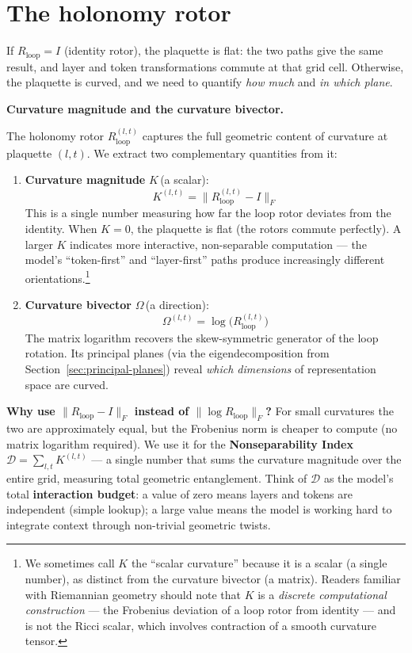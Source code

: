 \documentclass[11pt, twoside, openright]{memoir}
\numberwithin{equation}{chapter}
\begin{document}
\section{The holonomy rotor}

If $R_{\text{loop}} = I$ (identity rotor), the plaquette is flat:
the two paths give the same result, and layer and token
transformations commute at that grid cell.  Otherwise, the plaquette
is curved, and we need to quantify \emph{how much} and \emph{in
which plane}.

\begin{mathbox}
\textbf{Curvature magnitude and the curvature bivector.}

The holonomy rotor $R_{\text{loop}}^{(l,t)}$ captures the full
geometric content of curvature at plaquette $(l,t)$.  We extract two
complementary quantities from it:

\begin{enumerate}[nosep]
\item \textbf{Curvature magnitude} $K$\,(a scalar):
\begin{equation}
\label{eq:scalar-curvature}
  K^{(l,t)} = \|R_{\text{loop}}^{(l,t)} - I\|_F
\end{equation}
This is a single number measuring how far the loop rotor deviates
from the identity.  When $K = 0$, the plaquette is flat (the rotors
commute perfectly).  A larger $K$ indicates more interactive,
non-separable computation --- the model's ``token-first'' and
``layer-first'' paths produce increasingly different
orientations.\footnote{We sometimes call $K$ the ``scalar curvature''
because it is a scalar (a single number), as distinct from the
curvature bivector (a matrix).  Readers familiar with Riemannian
geometry should note that $K$ is a \emph{discrete computational
construction} --- the Frobenius deviation of a loop rotor from
identity --- and is not the Ricci scalar, which involves contraction
of a smooth curvature tensor.}

\item \textbf{Curvature bivector} $\Omega$\,(a direction):
\begin{equation}
  \Omega^{(l,t)} = \log\!\big(R_{\text{loop}}^{(l,t)}\big)
\end{equation}
The matrix logarithm recovers the skew-symmetric generator of the
loop rotation.  Its principal planes (via the eigendecomposition from
Section~\ref{sec:principal-planes}) reveal \emph{which dimensions} of
representation space are curved.
\end{enumerate}

\textbf{Why use $\|R_{\text{loop}} - I\|_F$ instead of
$\|\log R_{\text{loop}}\|_F$?}  For small curvatures the two are
approximately equal, but the Frobenius norm is cheaper to compute
(no matrix logarithm required).  We use it for the
\textbf{Nonseparability Index} $\mathcal{D} = \sum_{l,t}
K^{(l,t)}$ --- a single number that sums the curvature magnitude
over the entire grid, measuring total geometric entanglement.  Think
of $\mathcal{D}$ as the model's total \textbf{interaction budget}: a
value of zero means layers and tokens are independent (simple lookup);
a large value means the model is working hard to integrate context
through non-trivial geometric twists.
\end{mathbox}
\end{document}

